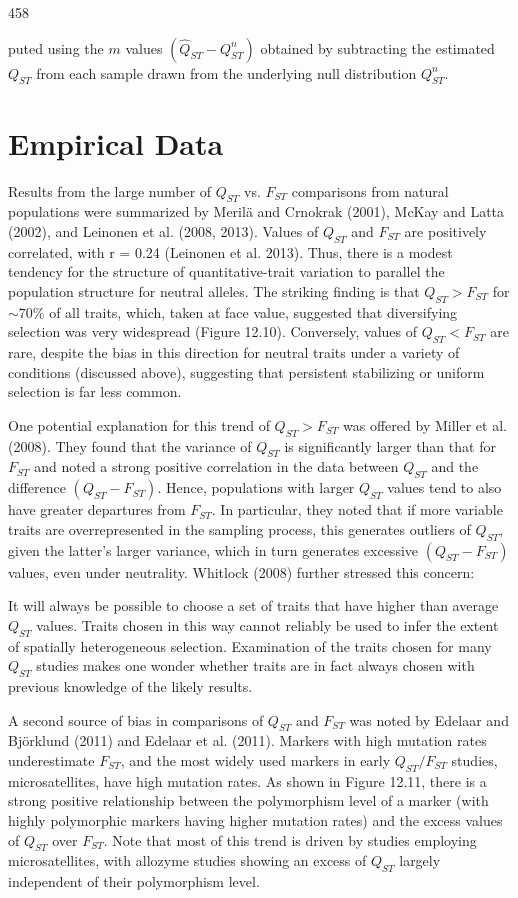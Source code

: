 \documentclass{article}
\begin{document}
458

puted using the $m$ values $(\widehat{Q}_{ST} - Q_{ST}^n)$ obtained by subtracting the estimated $Q_{ST}$ from each sample drawn from the underlying null distribution $Q_{ST}^n$.

\section{Empirical Data}
Results from the large number of  $ Q_{ST} $ vs.  $ F_{ST} $ comparisons from natural populations were summarized by Merilä and Crnokrak (2001), McKay and Latta (2002), and Leinonen et al. (2008, 2013). Values of  $ Q_{ST} $ and  $ F_{ST} $ are positively correlated, with r = 0.24 (Leinonen et al. 2013). Thus, there is a modest tendency for the structure of quantitative-trait variation to parallel the population structure for neutral alleles. The striking finding is that  $ Q_{ST} > F_{ST} $ for  $ \sim 70\% $ of all traits, which, taken at face value, suggested that diversifying selection was very widespread (Figure 12.10). Conversely, values of  $ Q_{ST} < F_{ST} $ are rare, despite the bias in this direction for neutral traits under a variety of conditions (discussed above), suggesting that persistent stabilizing or uniform selection is far less common.

One potential explanation for this trend of  $ Q_{ST} > F_{ST} $ was offered by Miller et al. (2008). They found that the variance of  $ Q_{ST} $ is significantly larger than that for  $ F_{ST} $ and noted a strong positive correlation in the data between  $ Q_{ST} $ and the difference  $ (Q_{ST} - F_{ST}) $. Hence, populations with larger  $ Q_{ST} $ values tend to also have greater departures from  $ F_{ST} $. In particular, they noted that if more variable traits are overrepresented in the sampling process, this generates outliers of  $ Q_{ST} $, given the latter's larger variance, which in turn generates excessive  $ (Q_{ST} - F_{ST}) $ values, even under neutrality. Whitlock (2008) further stressed this concern:

It will always be possible to choose a set of traits that have higher than average  $ Q_{ST} $ values. Traits chosen in this way cannot reliably be used to infer the extent of spatially heterogeneous selection. Examination of the traits chosen for many  $ Q_{ST} $ studies makes one wonder whether traits are in fact always chosen with previous knowledge of the likely results.

A second source of bias in comparisons of  $ Q_{ST} $ and  $ F_{ST} $ was noted by Edelaar and Björklund (2011) and Edelaar et al. (2011). Markers with high mutation rates underestimate  $ F_{ST} $, and the most widely used markers in early  $ Q_{ST}/F_{ST} $ studies, microsatellites, have high mutation rates. As shown in Figure 12.11, there is a strong positive relationship between the polymorphism level of a marker (with highly polymorphic markers having higher mutation rates) and the excess values of  $ Q_{ST} $ over  $ F_{ST} $. Note that most of this trend is driven by studies employing microsatellites, with allozyme studies showing an excess of  $ Q_{ST} $ largely independent of their polymorphism level.
\end{document}

